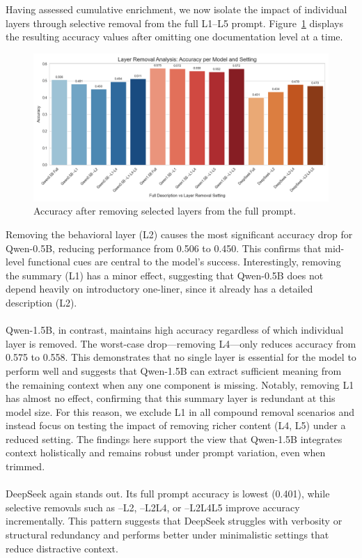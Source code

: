 \documentclass[a4paper]{usiinfbachelorproject}
\begin{document}
Having assessed cumulative enrichment, we now isolate the impact of individual layers through selective removal from the full L1–L5 prompt. Figure~\ref{fig:ablation-accuracy} displays the resulting accuracy values after omitting one documentation level at a time.
\begin{figure}[H]\centering
  \includegraphics[width=0.95\linewidth]{figures/ablation_accuracy.png}
  \caption{Accuracy after removing selected layers from the full prompt.}
  \label{fig:ablation-accuracy}
\end{figure}
\noindent
Removing the behavioral layer (L2) causes the most significant accuracy drop for Qwen-0.5B, reducing performance from 0.506 to 0.450. This confirms that mid-level functional cues are central to the model's success. Interestingly, removing the summary (L1) has a minor effect, suggesting that Qwen-0.5B does not depend heavily on introductory one-liner, since it already has a detailed description (L2). \\
\\
Qwen-1.5B, in contrast, maintains high accuracy regardless of which individual layer is removed. The worst-case drop—removing L4—only reduces accuracy from 0.575 to 0.558. This demonstrates that no single layer is essential for the model to perform well and suggests that Qwen-1.5B can extract sufficient meaning from the remaining context when any one component is missing. Notably, removing L1 has almost no effect, confirming that this summary layer is redundant at this model size. For this reason, we exclude L1 in all compound removal scenarios and instead focus on testing the impact of removing richer content (L4, L5) under a reduced setting. The findings here support the view that Qwen-1.5B integrates context holistically and remains robust under prompt variation, even when trimmed. \\
\\
DeepSeek again stands out. Its full prompt accuracy is lowest (0.401), while selective removals such as –L2, –L2L4, or –L2L4L5 improve accuracy incrementally. This pattern suggests that DeepSeek struggles with verbosity or structural redundancy and performs better under minimalistic settings that reduce distractive context.
\end{document}
